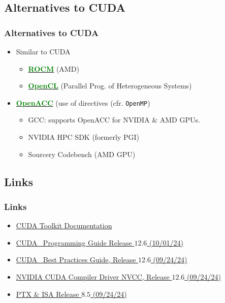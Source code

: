 \subsection{Alternatives to CUDA}
\begin{frame}
   \frametitle{Alternatives to CUDA}
      \begin{itemize}
         \item Similar to CUDA
   	    \begin{itemize}
	       \item \href{https://www.amd.com/en/products/software/rocm.html}{\textbf{\textcolor{green}{ROCM}}} (AMD)
 	       \item \href{https://www.khronos.org/opencl/}{\textbf{\textcolor{green}{OpenCL}}} (Parallel Prog. of Heterogeneous Systems)			 
  	    \end{itemize} 
          \item \href{https://www.openacc.org/}{\textbf{\textcolor{green}{OpenACC}}} (use of directives (cfr. \texttt{OpenMP})
             \begin{itemize}
                \item GCC: supports OpenACC for NVIDIA  \& AMD GPUs. 
                \item NVIDIA HPC SDK (formerly PGI)
                \item Sourcery Codebench (AMD GPU) %
	     \end{itemize}		     
      \end{itemize}
\end{frame}	

\subsection{Links}
\begin{frame}
   \frametitle{Links}
      \begin{itemize}
         \item \href{https://docs.nvidia.com/cuda/index.html}{CUDA Toolkit Documentation}
	 \item \href{https://docs.nvidia.com/cuda/cuda-c-programming-guide/index.html}{CUDA \CC\, Programming Guide Release $12.6$ 
		 (10/01/24)}
	 \item \href{https://docs.nvidia.com/cuda/cuda-c-best-practices-guide/index.html}{CUDA \CC\, Best Practices Guide, Release $12.6$ (09/24/24)}	      
         \item \href{https://docs.nvidia.com/cuda/cuda-compiler-driver-nvcc/}{NVIDIA CUDA Compiler Driver NVCC, Release $12.6$ (09/24/24)}		 
         \item \href{https://docs.nvidia.com/cuda/parallel-thread-execution/}{PTX \& ISA Release $8.5$ (09/24/24)}	
		 
      \end{itemize}		      
\end{frame}	

